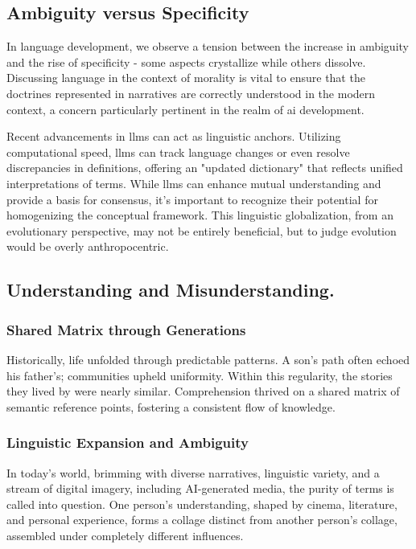 \documentclass[11pt,a4]{article}
\begin{document}
\subsection{Ambiguity versus Specificity}
    In language development, we observe a tension between the increase in ambiguity and the rise of
    specificity - some aspects crystallize while others dissolve. Discussing language in the context
    of morality is vital to ensure that the doctrines represented in narratives are correctly understood
    in the modern context, a concern particularly pertinent in the realm of \acrshort{ai} development.
    \par
    Recent advancements in \glspl{llm} can act as linguistic anchors.
    Utilizing computational speed, \glspl{llm}  can track language changes or even resolve discrepancies
    in definitions, offering an "updated dictionary" that reflects unified interpretations of terms.
     While \glspl{llm}  can enhance mutual understanding and provide a basis for consensus,
     it's important to recognize their potential for homogenizing the conceptual framework.
     This linguistic globalization, from an evolutionary perspective, may not be entirely beneficial,
     but to judge evolution would be overly anthropocentric.

\newpage
\subsection{Understanding and Misunderstanding.}

    \subsubsection{Shared Matrix through Generations}
        \par
        Historically, life unfolded through predictable patterns. A son's path often echoed his father's;
        communities upheld uniformity. Within this regularity, the stories they lived by were nearly similar.
        Comprehension thrived on a shared matrix of semantic reference points, fostering a consistent flow of knowledge.

    \subsubsection{Linguistic Expansion and Ambiguity}
        \par
        In today's world, brimming with diverse narratives, linguistic variety, and a stream of digital imagery,
        including AI-generated media, the purity of terms is called into question. One person's understanding,
        shaped by cinema, literature, and personal experience, forms a collage distinct from another
        person's collage, assembled under completely different influences.
\end{document}
